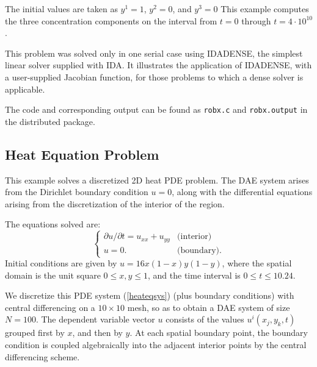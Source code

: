 \documentclass[11pt]{article}
\begin{document}
The initial values are taken as $y^1 = 1$, $y^2 = 0$, and $y^3 = 0$
This example computes the three concentration components on the interval
from $t=0$ through $t=4 \cdot 10^{10}$.

This problem was solved only in one serial case using IDADENSE, the simplest 
linear solver supplied with IDA. It illustrates the application of 
IDADENSE, with a user-supplied Jacobian function, for those problems to which
a dense solver is applicable.

The code and corresponding output can be found as {\tt robx.c} and 
{\tt robx.output} in the distributed package.


\subsection{Heat Equation Problem}

This example solves a discretized 2D heat PDE problem. The DAE system
arises from the Dirichlet boundary condition $u = 0$, along with the 
differential equations arising from the discretization of the interior 
of the region. 

The equations solved are:
\begin{equation}
\left\{ \begin{array}{ll}
     \partial u / \partial t  = u_{xx} + u_{yy}  & \mbox{(interior)} \\
      u = 0. & \mbox{(boundary)}.
\end{array} \right.                                       \label{heateqsys}
\end{equation}
Initial conditions are given by $u = 16x(1-x)y(1-y)$, where the spatial domain
is the unit square $0 \leq x,y \leq 1$, and the time interval is 
$0 \leq t \leq 10.24$.

We discretize this PDE system (\ref{heateqsys}) (plus boundary conditions)
with central differencing on a $10 \times 10$ mesh, so as to obtain a
DAE system of size $N = 100$.  The dependent variable vector $u$
consists of the values $u^i(x_j,y_k,t)$ grouped first by $x$, and then
 by $y$.  At each spatial boundary point, the boundary condition is coupled
algebraically into the adjacent interior points by the central differencing
scheme. 
\end{document}
